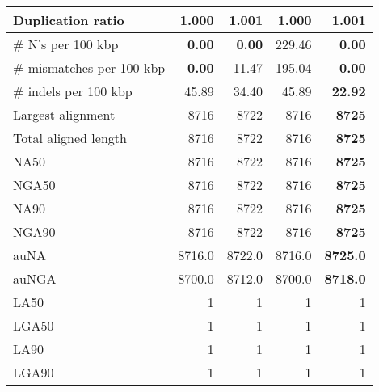 \documentclass[12pt,a4paper]{article}
\begin{document}
\begin{table}[ht]
\begin{center}
\begin{tabular}{|l*{4}{|r}|}
Duplication ratio & {\bf 1.000} & 1.001 & {\bf 1.000} & 1.001 \\ \hline
\# N's per 100 kbp & {\bf 0.00} & {\bf 0.00} & 229.46 & {\bf 0.00} \\ \hline
\# mismatches per 100 kbp & {\bf 0.00} & 11.47 & 195.04 & {\bf 0.00} \\ \hline
\# indels per 100 kbp & 45.89 & 34.40 & 45.89 & {\bf 22.92} \\ \hline
Largest alignment & 8716 & 8722 & 8716 & {\bf 8725} \\ \hline
Total aligned length & 8716 & 8722 & 8716 & {\bf 8725} \\ \hline
NA50 & 8716 & 8722 & 8716 & {\bf 8725} \\ \hline
NGA50 & 8716 & 8722 & 8716 & {\bf 8725} \\ \hline
NA90 & 8716 & 8722 & 8716 & {\bf 8725} \\ \hline
NGA90 & 8716 & 8722 & 8716 & {\bf 8725} \\ \hline
auNA & 8716.0 & 8722.0 & 8716.0 & {\bf 8725.0} \\ \hline
auNGA & 8700.0 & 8712.0 & 8700.0 & {\bf 8718.0} \\ \hline
LA50 & 1 & 1 & 1 & 1 \\ \hline
LGA50 & 1 & 1 & 1 & 1 \\ \hline
LA90 & 1 & 1 & 1 & 1 \\ \hline
LGA90 & 1 & 1 & 1 & 1 \\ \hline
\end{tabular}
\end{center}
\end{table}
\end{document}
